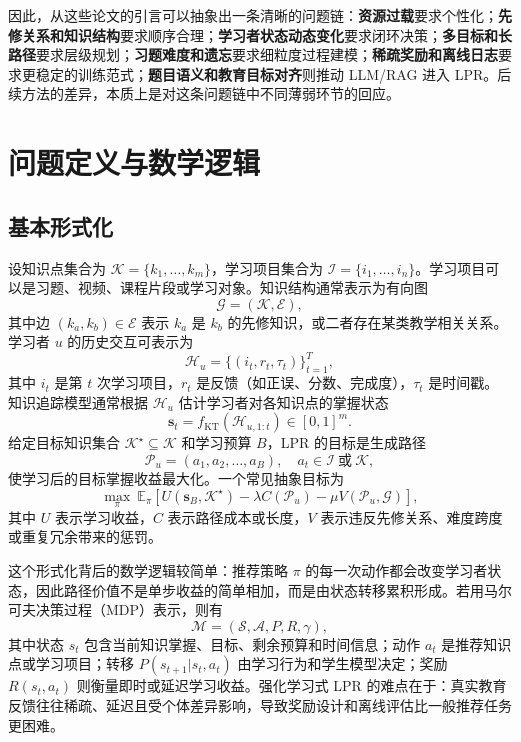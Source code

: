 \documentclass[UTF8,a4paper,zihao=-4]{ctexart}
\begin{document}
因此，从这些论文的引言可以抽象出一条清晰的问题链：\textbf{资源过载}要求个性化；\textbf{先修关系和知识结构}要求顺序合理；\textbf{学习者状态动态变化}要求闭环决策；\textbf{多目标和长路径}要求层级规划；\textbf{习题难度和遗忘}要求细粒度过程建模；\textbf{稀疏奖励和离线日志}要求更稳定的训练范式；\textbf{题目语义和教育目标对齐}则推动 LLM/RAG 进入 LPR。后续方法的差异，本质上是对这条问题链中不同薄弱环节的回应。

\section{问题定义与数学逻辑}

\subsection{基本形式化}

设知识点集合为 $\mathcal{K}=\{k_1,\ldots,k_m\}$，学习项目集合为 $\mathcal{I}=\{i_1,\ldots,i_n\}$。学习项目可以是习题、视频、课程片段或学习对象。知识结构通常表示为有向图
\begin{equation}
\mathcal{G}=(\mathcal{K},\mathcal{E}),
\end{equation}
其中边 $(k_a,k_b)\in\mathcal{E}$ 表示 $k_a$ 是 $k_b$ 的先修知识，或二者存在某类教学相关关系。学习者 $u$ 的历史交互可表示为
\begin{equation}
\mathcal{H}_u=\{(i_t,r_t,\tau_t)\}_{t=1}^{T},
\end{equation}
其中 $i_t$ 是第 $t$ 次学习项目，$r_t$ 是反馈（如正误、分数、完成度），$\tau_t$ 是时间戳。知识追踪模型通常根据 $\mathcal{H}_u$ 估计学习者对各知识点的掌握状态
\begin{equation}
\mathbf{s}_t=f_{\mathrm{KT}}(\mathcal{H}_{u,1:t})\in [0,1]^m.
\end{equation}
给定目标知识集合 $\mathcal{K}^{\star}\subseteq\mathcal{K}$ 和学习预算 $B$，LPR 的目标是生成路径
\begin{equation}
\mathcal{P}_u=(a_1,a_2,\ldots,a_B),\quad a_t\in\mathcal{I}\ \text{或}\ \mathcal{K},
\end{equation}
使学习后的目标掌握收益最大化。一个常见抽象目标为
\begin{equation}
\max_{\pi}\ \mathbb{E}_{\pi}\left[U(\mathbf{s}_{B},\mathcal{K}^{\star})-\lambda C(\mathcal{P}_u)-\mu V(\mathcal{P}_u,\mathcal{G})\right],
\end{equation}
其中 $U$ 表示学习收益，$C$ 表示路径成本或长度，$V$ 表示违反先修关系、难度跨度或重复冗余带来的惩罚。

这个形式化背后的数学逻辑较简单：推荐策略 $\pi$ 的每一次动作都会改变学习者状态，因此路径价值不是单步收益的简单相加，而是由状态转移累积形成。若用马尔可夫决策过程（MDP）表示，则有
\begin{equation}
\mathcal{M}=(\mathcal{S},\mathcal{A},P,R,\gamma),
\end{equation}
其中状态 $s_t$ 包含当前知识掌握、目标、剩余预算和时间信息；动作 $a_t$ 是推荐知识点或学习项目；转移 $P(s_{t+1}|s_t,a_t)$ 由学习行为和学生模型决定；奖励 $R(s_t,a_t)$ 则衡量即时或延迟学习收益。强化学习式 LPR 的难点在于：真实教育反馈往往稀疏、延迟且受个体差异影响，导致奖励设计和离线评估比一般推荐任务更困难。
\end{document}
